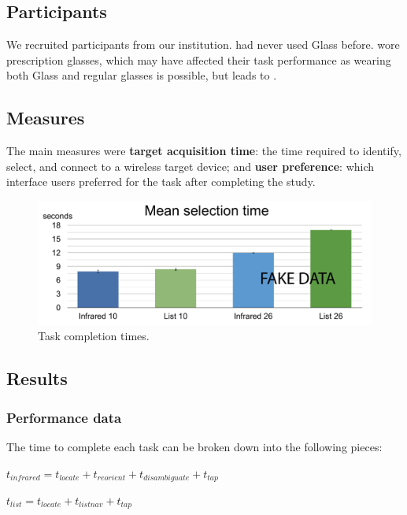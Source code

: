 \subsection{Participants}
We recruited  participants from our institution.  had never used Glass before.  wore prescription glasses, which may have affected their task performance as wearing both Glass and regular glasses is possible, but leads to .

\subsection{Measures}
The main measures were {\bf target acquisition time}: the time required to identify, select, and connect to a wireless target device; and {\bf user preference}: which interface users preferred for the task after completing the study.


\begin{figure}[t]
\centering
\includegraphics[width=1.0\columnwidth]{figures/selection-times2.pdf}
\caption{Task completion times. }
\label{fig:selection-times}
\end{figure}
\subsection{Results}

\subsubsection{Performance data}
The time to complete each task can be broken down into the following pieces:

$t_{infrared}=t_{locate}+t_{reorient}+t_{disambiguate}+t_{tap}$

$t_{list}=t_{locate}+t_{listnav}+t_{tap}$


